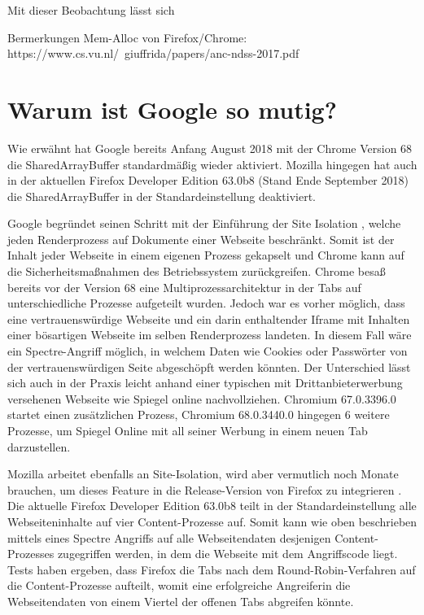 Mit dieser Beobachtung lässt sich 

Bermerkungen Mem-Alloc von Firefox/Chrome: https://www.cs.vu.nl/~giuffrida/papers/anc-ndss-2017.pdf
\cite{ASLROnTheLine}

\section{Warum ist Google so mutig?}
\label{GooglePageIsolation}

Wie erwähnt hat Google bereits Anfang August 2018 mit der Chrome Version 68 \cite{ChromeSharedArrayBufferAgain} die SharedArrayBuffer standardmäßig wieder aktiviert.
Mozilla hingegen hat auch in der aktuellen Firefox Developer Edition 63.0b8 (Stand Ende September 2018) die SharedArrayBuffer in der Standardeinstellung deaktiviert.

Google begründet seinen Schritt mit der Einführung der Site Isolation \cite{ChromeSiteIsolation}, welche jeden Renderprozess auf Dokumente einer Webseite beschränkt. Somit ist der Inhalt jeder Webseite in einem eigenen Prozess gekapselt und Chrome kann auf die Sicherheitsmaßnahmen des Betriebssystem zurückgreifen.
Chrome besaß bereits vor der Version 68 eine Multiprozessarchitektur in der Tabs auf unterschiedliche Prozesse aufgeteilt wurden.
Jedoch war es vorher möglich, dass eine vertrauenswürdige Webseite und ein darin enthaltender Iframe mit Inhalten einer bösartigen Webseite im selben Renderprozess landeten.
In diesem Fall wäre ein Spectre-Angriff möglich, in welchem Daten wie Cookies oder Passwörter von der vertrauenswürdigen Seite abgeschöpft werden könnten.
Der Unterschied lässt sich auch in der Praxis leicht anhand einer typischen mit Drittanbieterwerbung versehenen Webseite wie Spiegel online nachvollziehen.
Chromium 67.0.3396.0 startet einen zusätzlichen Prozess, Chromium 68.0.3440.0 hingegen 6 weitere Prozesse, um Spiegel Online mit all seiner Werbung in einem neuen Tab darzustellen.


Mozilla arbeitet ebenfalls an Site-Isolation, wird aber vermutlich noch Monate brauchen, um dieses Feature in die Release-Version von Firefox zu integrieren \cite{FirefoxSiteIsolation}.
Die aktuelle Firefox Developer Edition 63.0b8 teilt in der Standardeinstellung alle Webseiteninhalte auf vier Content-Prozesse auf. 
Somit kann wie oben beschrieben mittels eines Spectre Angriffs auf alle Webseitendaten desjenigen Content-Prozesses zugegriffen werden, in dem die Webseite mit dem Angriffscode liegt.
Tests haben ergeben, dass Firefox die Tabs nach dem Round-Robin-Verfahren auf die Content-Prozesse aufteilt, womit eine erfolgreiche Angreiferin die Webseitendaten von einem Viertel der offenen Tabs abgreifen könnte.

